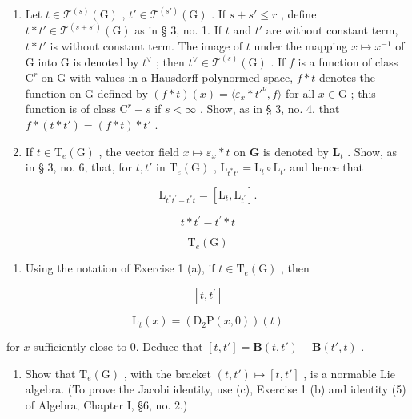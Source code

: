 \begin{enumerate}
\def\labelenumi{(\alph{enumi})}
\item
  Let \(t \in \mathcal{T}^{(s)}(\mathrm{G})\) , \(t' \in \mathcal{T}^{(s')}(\mathrm{G})\) . If \(s + s' \leqslant r\) , define \(t * t' \in \mathcal{T}^{(s + s')}(\mathrm{G})\) as in § 3, no. 1. If \(t\) and \(t'\) are without constant term, \(t * t'\) is without constant term. The image of \(t\) under the mapping \(x \mapsto x^{-1}\) of \(\mathrm{G}\) into \(\mathrm{G}\) is denoted by \(t^{\vee}\) ; then \(t^{\vee} \in \mathcal{T}^{(s)}(\mathrm{G})\) . If \(f\) is a function of class \(\mathrm{C}^r\) on \(\mathrm{G}\) with values in a Hausdorff polynormed space, \(f * t\) denotes the function on \(\mathrm{G}\) defined by \((f * t)(x) = \langle \varepsilon_x * t'^{\nu}, f \rangle\) for all \(x \in \mathrm{G}\) ; this function is of class \(\mathrm{C}^r - s\) if \(s < \infty\) . Show, as in § 3, no. 4, that \(f * (t * t') = (f * t) * t'\) .
\item
  If \(t \in \mathrm{T}_e(\mathrm{G})\) , the vector field \(x \mapsto \varepsilon_x * t\) on \(\mathbf{G}\) is denoted by \(\mathbf{L}_t\) . Show, as in § 3, no. 6, that, for \(t, t'\) in \(\mathrm{T}_e(\mathrm{G})\) , \(\mathrm{L}_{t^* t'} = \mathrm{L}_t \circ \mathrm{L}_{t'}\) and hence that
\end{enumerate}

\[
\mathrm{L} _ {t ^ {*} t ^ {\prime} - t ^ {*} t} = \left[ \mathrm{L} _ {t}, \mathrm{L} _ {t ^ {\prime}} \right].
\]

\[
t * t ^ {\prime} - t ^ {\prime} * t
\]

\[
\mathrm{T} _ {e} (\mathrm{G})
\]

\begin{enumerate}
\def\labelenumi{(\alph{enumi})}
\setcounter{enumi}{2}
\tightlist
\item
  Using the notation of Exercise 1 (a), if \(t \in \mathrm{T}_e(\mathrm{G})\) , then
\end{enumerate}

\[
[ t, t ^ {\prime} ]
\]

\[
\mathrm{L} _ {t} (x) = (\mathrm{D} _ {2} \mathrm{P} (x, 0)) (t)
\]

for \(x\) sufficiently close to 0. Deduce that \([t, t'] = \mathbf{B}(t, t') - \mathbf{B}(t', t)\) .

\begin{enumerate}
\def\labelenumi{(\alph{enumi})}
\setcounter{enumi}{3}
\tightlist
\item
  Show that \(\mathrm{T}_e(\mathrm{G})\) , with the bracket \((t, t') \mapsto [t, t']\) , is a normable Lie algebra. (To prove the Jacobi identity, use (c), Exercise 1 (b) and identity (5) of Algebra, Chapter I, §6, no. 2.)
\end{enumerate}

